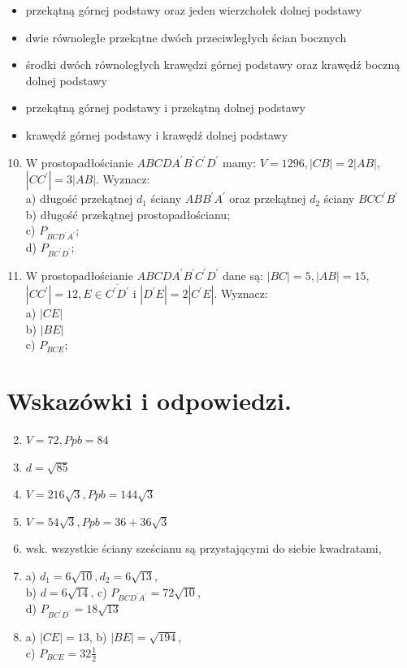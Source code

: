 \documentclass[10pt]{article}
\begin{document}
\begin{itemize}
  \item przekątną górnej podstawy oraz jeden wierzchołek dolnej podstawy
  \item dwie równoległe przekątne dwóch przeciwległych ścian bocznych
  \item środki dwóch równoległych krawędzi górnej podstawy oraz krawędź boczną dolnej podstawy
  \item przekątną górnej podstawy i przekątną dolnej podstawy
  \item krawędź górnej podstawy i krawędź dolnej podstawy
\end{itemize}

\begin{enumerate}
  \setcounter{enumi}{9}
  \item W prostopadłościanie \(A B C D A^{\prime} B^{\prime} C^{\prime} D^{\prime}\) mamy: \(V=1296,|C B|=2|A B|\), \(\left|C C^{\prime}\right|=3|A B|\). Wyznacz:\\
a) długość przekątnej \(d_{1}\) ściany \(A B B^{\prime} A^{\prime}\) oraz przekątnej \(d_{2}\) ściany \(B C C^{\prime} B^{\prime}\)\\
b) długość przekątnej prostopadłościanu;\\
c) \(P_{B C D^{\prime} A^{\prime}}\);\\
d) \(P_{B C^{\prime} D^{\prime}}\);
  \item W prostopadłościanie \(A B C D A^{\prime} B^{\prime} C^{\prime} D^{\prime}\) dane są: \(|B C|=5,|A B|=15\), \(\left|C C^{\prime}\right|=12, E \in \overline{C^{\prime} D^{\prime}}\) i \(\left|D^{\prime} E\right|=2\left|C^{\prime} E\right|\). Wyznacz:\\
a) \(|C E|\)\\
b) \(|B E|\)\\
c) \(P_{B C E}\);
\end{enumerate}

\section*{Wskazówki i odpowiedzi.}
\begin{enumerate}
  \setcounter{enumi}{1}
  \item \(V=72, P p b=84\)
  \item \(d=\sqrt{85}\)
  \item \(V=216 \sqrt{3}, P p b=144 \sqrt{3}\)
  \item \(V=54 \sqrt{3}, P p b=36+36 \sqrt{3}\)
  \item wsk. wszystkie ściany sześcianu są przystającymi do siebie kwadratami,
  \item a) \(d_{1}=6 \sqrt{10}, d_{2}=6 \sqrt{13}\),\\
b) \(d=6 \sqrt{14}\), c) \(P_{B C D^{\prime} A^{\prime}}=72 \sqrt{10}\),\\
d) \(P_{B C^{\prime} D^{\prime}}=18 \sqrt{13}\)
  \item a) \(|C E|=13\), b) \(|B E|=\sqrt{194}\),\\
c) \(P_{B C E}=32 \frac{1}{2}\)
\end{enumerate}
\end{document}
